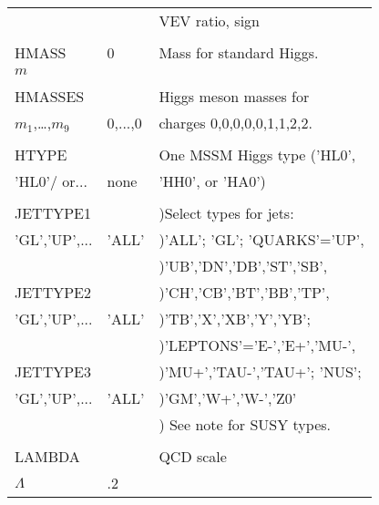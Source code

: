 \begin{center}
\begin{tabular}{lll}
                       &                   & VEV ratio, sign                \\
                       &                   &                                \\
HMASS                  & 0                 & Mass for standard Higgs.       \\
$m$                    &                   &                                \\
                       &                   &                                \\
HMASSES                &                   & Higgs meson masses for         \\
$m_1$,\dots,$m_9$      & 0,...,0           & charges 0,0,0,0,0,1,1,2,2.     \\
                       &                   &                                \\
HTYPE                  &                   & One MSSM Higgs type ('HL0',    \\
'HL0'/ or...           & none              & 'HH0', or 'HA0')               \\
                       &                   &                                \\
JETTYPE1               &                   & )Select types for jets:        \\
'GL','UP',...          & 'ALL'             & )'ALL'; 'GL'; 'QUARKS'='UP',   \\
                       &                   & )'UB','DN','DB','ST','SB',     \\
JETTYPE2               &                   & )'CH','CB','BT','BB','TP',     \\
'GL','UP',...          & 'ALL'             & )'TB','X','XB','Y','YB';       \\
                       &                   & )'LEPTONS'='E-','E+','MU-',    \\
JETTYPE3               &                   & )'MU+','TAU-','TAU+'; 'NUS';   \\
'GL','UP',...          & 'ALL'             & )'GM','W+','W-','Z0'           \\
                       &                   & ) See note for SUSY types.     \\
                       &                   &                                \\
LAMBDA                 &                   & QCD scale                      \\
$\Lambda$              & .2                &                                \\
\hline\hline
\end{tabular}
\end{center}

